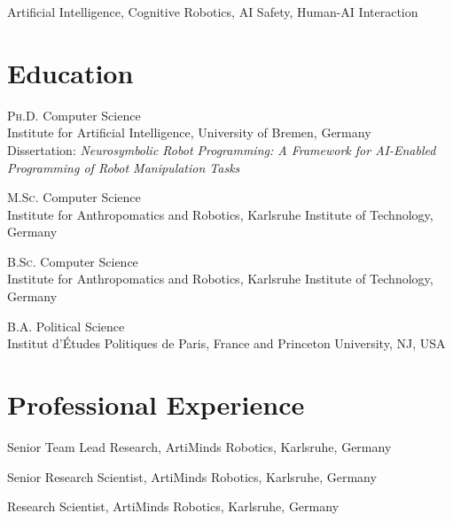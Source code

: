 \documentclass[11pt]{article} %
\begin{document}
Artificial Intelligence, Cognitive Robotics, AI Safety, Human-AI Interaction %



\section*{Education}

\textsc{Ph.D.} Computer Science\\
Institute for Artificial Intelligence, University of Bremen, Germany\\
Dissertation: \textit{Neurosymbolic Robot Programming: A Framework for AI-Enabled Programming of Robot Manipulation Tasks}

\medskip

\textsc{M.Sc.} Computer Science\\
Institute for Anthropomatics and Robotics, Karlsruhe Institute of Technology, Germany

\medskip

\textsc{B.Sc.} Computer Science\\
Institute for Anthropomatics and Robotics, Karlsruhe Institute of Technology, Germany

\medskip

\textsc{B.A.} Political Science\\
Institut d'Études Politiques de Paris, France and Princeton University, NJ, USA


\section*{Professional Experience}

Senior Team Lead Research, ArtiMinds Robotics, Karlsruhe, Germany

\medskip

Senior Research Scientist, ArtiMinds Robotics, Karlsruhe, Germany

\medskip

Research Scientist, ArtiMinds Robotics, Karlsruhe, Germany
\end{document}
